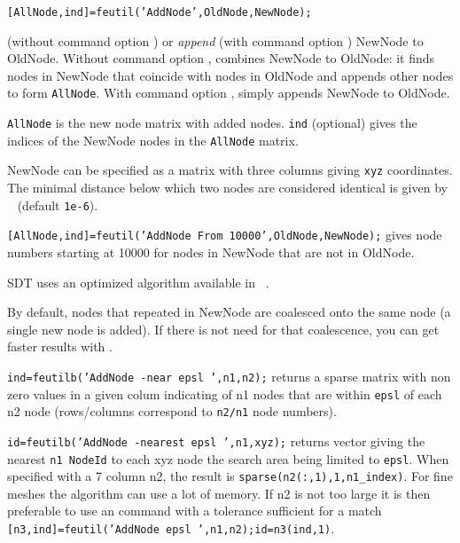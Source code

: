 
{\tt [AllNode,ind]=feutil('AddNode',{\ti OldNode},{\ti NewNode});}

 (without command option ) or {\sl append} (with command option ) {\ti NewNode} to {\ti OldNode}. 
Without command option ,  combines {\ti NewNode} to {\ti OldNode}: it finds nodes in {\ti NewNode} that coincide with nodes in {\ti OldNode} and appends other nodes to form {\tt AllNode}. 
With command option ,  simply appends {\ti NewNode} to {\ti OldNode}.

{\tt AllNode} is the new node matrix with added nodes.
{\tt ind} (optional) gives the indices of the {\ti NewNode} nodes in the {\tt AllNode} matrix.

{\ti NewNode} can be specified as a matrix with three columns giving {\tt xyz} coordinates. The minimal distance below which two nodes are considered identical is given by \sdtdef\  (default {\tt 1e-6}).

{\tt [AllNode,ind]=feutil('AddNode From 10000',{\ti OldNode},{\ti NewNode});} gives node numbers starting at 10000 for nodes in {\ti NewNode} that are not in {\ti OldNode}.

\begin{SDT}
SDT uses an optimized algorithm available in \feutilb\ . 

By default, nodes that repeated in {\ti NewNode} are coalesced onto the same node (a single new node is added). If there is not need for that coalescence, you can get faster results with .  

{\tt ind=feutilb('AddNode -near epsl ',{\ti n1},{\ti n2});} returns a sparse matrix with non zero values in a given colum indicating of {\ti n1} nodes that are within {\tt epsl} of each {\ti n2} node (rows/columns correspond to {\tt n2/n1} node numbers). 

{\tt id=feutilb('AddNode -nearest epsl ',{\ti n1},{\ti xyz});} returns vector giving the nearest {\tt {\ti n1} NodeId}  to each {\ti xyz} node the search area being limited to {\tt epsl}. When specified with a 7 column {\ti n2}, the result is {\tt sparse(n2(:,1),1,n1\_index)}. For fine meshes the algorithm can use a lot of memory. If {\ti n2} is not too large it is then preferable to use an  command with a tolerance sufficient for a match {\tt [n3,ind]=feutil('AddNode epsl ',{\ti n1},{\ti n2});id=n3(ind,1)}.
\end{SDT}

